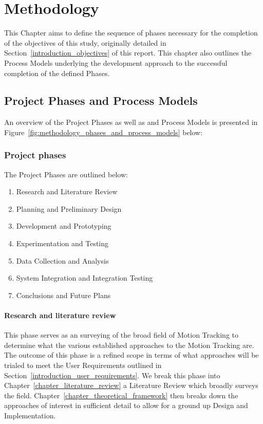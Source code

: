 \chapter{Methodology}\label{methodology}
This Chapter aims to define the sequence of phases necessary for the completion
of the objectives of this study, originally detailed in Section~\ref{introduction_objectives} of this report.
This chapter also outlines the Process Models underlying the development
approach to the successful completion of the defined Phases.

\section{Project Phases and Process Models}
An overview of the Project Phases as well as and Process Models is presented in
Figure~\ref{fig:methodology_phases_and_process_models} below:

\subsection{Project phases}
The Project Phases are outlined below:
\begin{enumerate}
    \item Research and Literature Review
    \item Planning and Preliminary Design
    \item Development and Prototyping 
    \item Experimentation and Testing
    \item Data Collection and Analysis
    \item System Integration and Integration Testing
    \item Conclusions and Future Plans
\end{enumerate}

\subsubsection{Research and literature review}
This phase serves as an surveying of the broad field of Motion Tracking to
determine what the various established approaches to the Motion Tracking are.
The outcome of this phase is a refined scope in terms of what approaches will be
trialed to meet the User Requirements outlined in
Section~\ref{introduction_user_requirements}. We break this phase into
Chapter~\ref{chapter_literature_review} a Literature Review which broadly
surveys the field. Chapter~\ref{chapter_theoretical_framework} then breaks down
the approaches of interest in sufficient detail to allow for a ground up Design
and Implementation.

